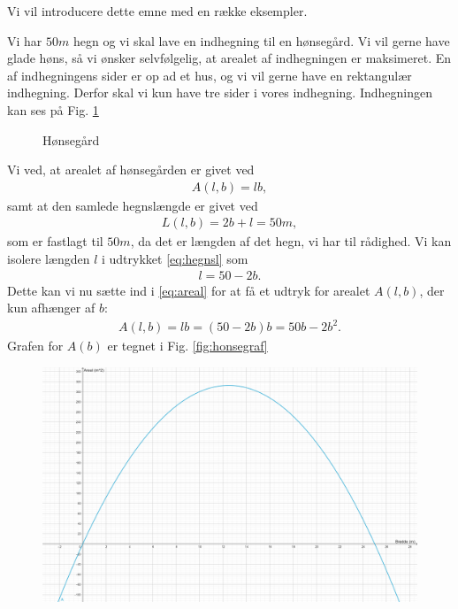 Vi vil introducere dette emne med en række eksempler. 
\begin{exa}
Vi har $50m$ hegn og vi skal lave en indhegning til en hønsegård. Vi vil gerne have glade høns, så vi ønsker selvfølgelig, at arealet af indhegningen er maksimeret. En af indhegningens sider er op ad et hus, og vi vil gerne have en rektangulær indhegning. Derfor skal vi kun have tre sider i vores indhegning. Indhegningen kan ses på Fig. \ref{fig:indh}
\begin{figure}[H]
\centering
{}
\caption{Hønsegård}
\label{fig:indh}
\end{figure}
Vi ved, at arealet af hønsegården er givet ved 
\begin{align}\label{eq:areal}
A(l,b) = lb,
\end{align}
samt at den samlede hegnslængde er givet ved 
\begin{align}\label{eq:hegnsl}
L(l,b) = 2b+l = 50m,
\end{align}
som er fastlagt til $50m$, da det er længden af det hegn, vi har til rådighed. Vi kan isolere længden $l$ i udtrykket \eqref{eq:hegnsl} som
\begin{align}\label{eq:lsomfb}
l = 50-2b.
\end{align}
Dette kan vi nu sætte ind i \eqref{eq:areal} for at få et udtryk for arealet $A(l,b)$, der kun afhænger af $b$:
\begin{align*}
A(l,b) = lb = (50-2b)b = 50b-2b^2.
\end{align*}
Grafen for $A(b)$ er tegnet i Fig. \ref{fig:honsegraf}
\begin{figure}[H]
\includegraphics[width=\textwidth]{Billeder/honsegraf.png}

\end{figure}
\end{exa}
